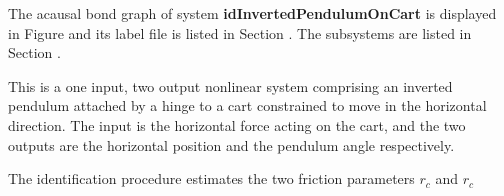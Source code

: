 

   The acausal bond graph of system \textbf{idInvertedPendulumOnCart} is
   displayed in Figure  and its label
   file is listed in Section .
   The subsystems are listed in Section .

This is a one input, two output nonlinear system comprising an
inverted pendulum attached by a hinge to a cart constrained to move in
the horizontal direction. The input is the horizontal force acting on
the cart, and the two outputs are the horizontal position and the
pendulum angle respectively.

The identification procedure estimates the two friction parameters
$r_c$ and $r_c$